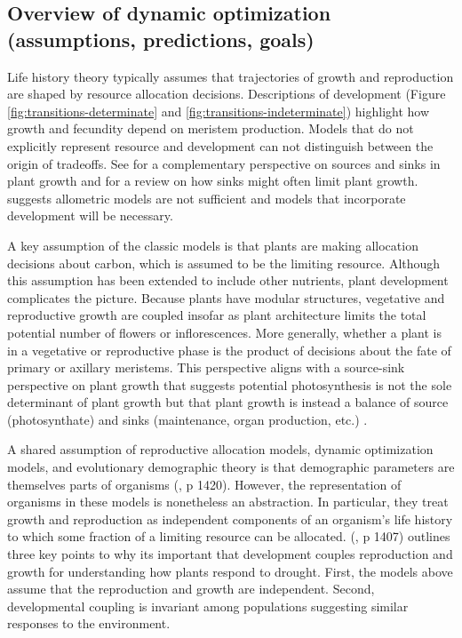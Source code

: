 \documentclass[12pt, oneside,titlepage]{article}   	%
\begin{document}
\subsection{Overview of dynamic optimization (assumptions, predictions, goals)}

Life history theory typically assumes that trajectories of growth and reproduction are shaped by resource allocation decisions. Descriptions of development (Figure \ref{fig:transitions-determinate} and \ref{fig:transitions-indeterminate}) highlight how growth and fecundity depend on meristem production. Models that do not explicitly represent resource and development can not distinguish between the origin of tradeoffs. See \cite{white2016} for a complementary perspective on sources and sinks in plant growth and \cite{korner2015} for a review on how sinks might often limit plant growth. \cite{fox1992a} suggests allometric models are not sufficient and models that incorporate development will be necessary.

A key assumption of the classic models is that plants are making allocation decisions about carbon, which is assumed to be the limiting resource. Although this assumption has been extended to include other nutrients, plant development complicates the picture. Because plants have modular structures, vegetative and reproductive growth are coupled insofar as plant architecture limits the total potential number of flowers or inflorescences. More generally, whether a plant is in a vegetative or reproductive phase is the product of decisions about the fate of primary or axillary meristems. This perspective aligns with a source-sink perspective on plant growth that suggests potential photosynthesis is not the sole determinant of plant growth but that plant growth is instead a balance of source (photosynthate) and sinks (maintenance, organ production, etc.) \cite{korner2015,white2016}.

A shared assumption of reproductive allocation models, dynamic optimization models, and evolutionary demographic theory is that demographic parameters are themselves parts of organisms (\cite{fox1990}, p 1420). However, the representation of organisms in these models is nonetheless an abstraction. In particular, they treat growth and reproduction as independent components of an organism's life history to which some fraction of a limiting resource can be allocated. (\cite{fox1990}, p 1407) outlines three key points to why its important that development couples reproduction and growth for understanding how plants respond to drought. First, the models above assume that the reproduction and growth are independent. Second, developmental coupling is invariant among populations suggesting similar responses to the environment. 
\end{document}
